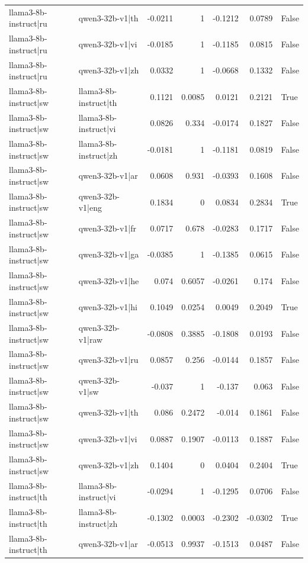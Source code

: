 \begin{table}
\begin{tabular}{l l r r r r l}
llama3-8b-instruct|ru & qwen3-32b-v1|th & -0.0211 & 1 & -0.1212 & 0.0789 & False \\
llama3-8b-instruct|ru & qwen3-32b-v1|vi & -0.0185 & 1 & -0.1185 & 0.0815 & False \\
llama3-8b-instruct|ru & qwen3-32b-v1|zh & 0.0332 & 1 & -0.0668 & 0.1332 & False \\
llama3-8b-instruct|sw & llama3-8b-instruct|th & 0.1121 & 0.0085 & 0.0121 & 0.2121 & True \\
llama3-8b-instruct|sw & llama3-8b-instruct|vi & 0.0826 & 0.334 & -0.0174 & 0.1827 & False \\
llama3-8b-instruct|sw & llama3-8b-instruct|zh & -0.0181 & 1 & -0.1181 & 0.0819 & False \\
llama3-8b-instruct|sw & qwen3-32b-v1|ar & 0.0608 & 0.931 & -0.0393 & 0.1608 & False \\
llama3-8b-instruct|sw & qwen3-32b-v1|eng & 0.1834 & 0 & 0.0834 & 0.2834 & True \\
llama3-8b-instruct|sw & qwen3-32b-v1|fr & 0.0717 & 0.678 & -0.0283 & 0.1717 & False \\
llama3-8b-instruct|sw & qwen3-32b-v1|ga & -0.0385 & 1 & -0.1385 & 0.0615 & False \\
llama3-8b-instruct|sw & qwen3-32b-v1|he & 0.074 & 0.6057 & -0.0261 & 0.174 & False \\
llama3-8b-instruct|sw & qwen3-32b-v1|hi & 0.1049 & 0.0254 & 0.0049 & 0.2049 & True \\
llama3-8b-instruct|sw & qwen3-32b-v1|raw & -0.0808 & 0.3885 & -0.1808 & 0.0193 & False \\
llama3-8b-instruct|sw & qwen3-32b-v1|ru & 0.0857 & 0.256 & -0.0144 & 0.1857 & False \\
llama3-8b-instruct|sw & qwen3-32b-v1|sw & -0.037 & 1 & -0.137 & 0.063 & False \\
llama3-8b-instruct|sw & qwen3-32b-v1|th & 0.086 & 0.2472 & -0.014 & 0.1861 & False \\
llama3-8b-instruct|sw & qwen3-32b-v1|vi & 0.0887 & 0.1907 & -0.0113 & 0.1887 & False \\
llama3-8b-instruct|sw & qwen3-32b-v1|zh & 0.1404 & 0 & 0.0404 & 0.2404 & True \\
llama3-8b-instruct|th & llama3-8b-instruct|vi & -0.0294 & 1 & -0.1295 & 0.0706 & False \\
llama3-8b-instruct|th & llama3-8b-instruct|zh & -0.1302 & 0.0003 & -0.2302 & -0.0302 & True \\
llama3-8b-instruct|th & qwen3-32b-v1|ar & -0.0513 & 0.9937 & -0.1513 & 0.0487 & False \\

\end{tabular}
\end{table}
